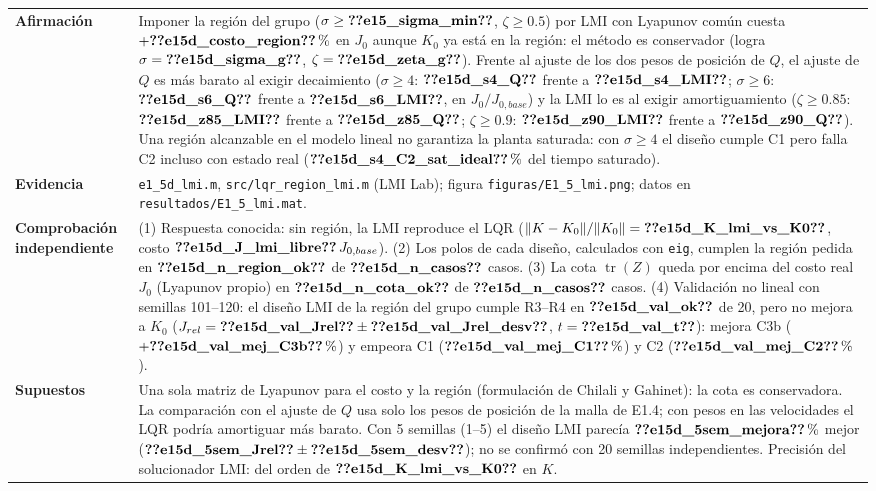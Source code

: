 \begin{recuadro}[title=Ficha de evidencia — E1.5 (bonificación): síntesis por regiones de polos con LMI]
\begin{tabularx}{\linewidth}{@{}>{\bfseries}p{3.1cm} >{\raggedright\arraybackslash}X@{}}
Afirmación &
Imponer la región del grupo ($\sigma\ge\V{e15_sigma_min}$, $\zeta\ge0.5$) por LMI con Lyapunov común cuesta
$+\V{e15d_costo_region}\,\%$ en $J_0$ aunque $K_0$ ya está en la región: el método es conservador (logra
$\sigma=\V{e15d_sigma_g}$, $\zeta=\V{e15d_zeta_g}$). Frente al ajuste de los dos pesos de posición de $Q$, el ajuste de
$Q$ es más barato al exigir decaimiento ($\sigma\ge4$: $\V{e15d_s4_Q}$ frente a $\V{e15d_s4_LMI}$; $\sigma\ge6$:
$\V{e15d_s6_Q}$ frente a $\V{e15d_s6_LMI}$, en $J_0/J_{0,base}$) y la LMI lo es al exigir amortiguamiento
($\zeta\ge0.85$: $\V{e15d_z85_LMI}$ frente a $\V{e15d_z85_Q}$; $\zeta\ge0.9$: $\V{e15d_z90_LMI}$ frente a $\V{e15d_z90_Q}$).
Una región alcanzable en el modelo lineal no garantiza la planta saturada: con $\sigma\ge4$ el diseño cumple C1
pero falla C2 incluso con estado real ($\V{e15d_s4_C2_sat_ideal}\,\%$ del tiempo saturado). \\[3pt]
Evidencia &
\texttt{e1\_5d\_lmi.m}, \texttt{src/lqr\_region\_lmi.m} (LMI Lab); figura \texttt{figuras/E1\_5\_lmi.png};
datos en \texttt{resultados/E1\_5\_lmi.mat}. \\[3pt]
Comprobación independiente &
(1) Respuesta conocida: sin región, la LMI reproduce el LQR ($\|K-K_0\|/\|K_0\|=\V{e15d_K_lmi_vs_K0}$, costo
$\V{e15d_J_lmi_libre}\,J_{0,base}$).
(2) Los polos de cada diseño, calculados con \texttt{eig}, cumplen la región pedida en $\V{e15d_n_region_ok}$ de
$\V{e15d_n_casos}$ casos.
(3) La cota $\operatorname{tr}(Z)$ queda por encima del costo real $J_0$ (Lyapunov propio) en $\V{e15d_n_cota_ok}$ de
$\V{e15d_n_casos}$ casos.
(4) Validación no lineal con semillas 101--120: el diseño LMI de la región del grupo cumple R3--R4 en
$\V{e15d_val_ok}$ de 20, pero no mejora a $K_0$ ($J_{rel}=\V{e15d_val_Jrel}\pm\V{e15d_val_Jrel_desv}$, $t=\V{e15d_val_t}$):
mejora C3b ($+\V{e15d_val_mej_C3b}\,\%$) y empeora C1 ($\V{e15d_val_mej_C1}\,\%$) y C2 ($\V{e15d_val_mej_C2}\,\%$). \\[3pt]
Supuestos &
Una sola matriz de Lyapunov para el costo y la región (formulación de Chilali y Gahinet): la cota es
conservadora. La comparación con el ajuste de $Q$ usa solo los pesos de posición de la malla de E1.4; con
pesos en las velocidades el LQR podría amortiguar más barato. Con 5 semillas (1--5) el diseño LMI parecía
$\V{e15d_5sem_mejora}\,\%$ mejor ($\V{e15d_5sem_Jrel}\pm\V{e15d_5sem_desv}$); no se confirmó con 20 semillas independientes.
Precisión del solucionador LMI: del orden de $\V{e15d_K_lmi_vs_K0}$ en $K$.
\end{tabularx}
\end{recuadro}

